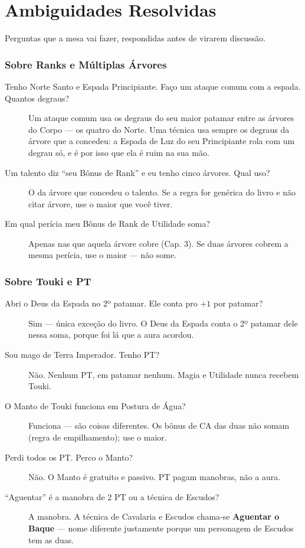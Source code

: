 \chapter{Ambiguidades Resolvidas}

Perguntas que a mesa vai fazer, respondidas antes de virarem discussão.

\subsection{Sobre Ranks e Múltiplas Árvores}

\begin{description}
    \item[Tenho Norte Santo e Espada Principiante. Faço um ataque comum com a espada.
          Quantos degraus?] Um ataque comum usa os degraus do seu maior patamar entre as
          árvores do Corpo --- os quatro do Norte. Uma técnica usa sempre os degraus da árvore
          que a concedeu: a Espada de Luz do seu Principiante rola com um degrau só, e é por
          isso que ela é ruim na sua mão.
    \item[Um talento diz \enquote{seu Bônus de Rank} e eu tenho cinco árvores. Qual uso?] O da
          árvore que concedeu o talento. Se a regra for genérica do livro e não citar árvore,
          use o maior que você tiver.
    \item[Em qual perícia meu Bônus de Rank de Utilidade soma?] Apenas nas que aquela árvore
          cobre (Cap. 3). Se duas árvores cobrem a mesma perícia, use o maior --- não some.
\end{description}

\subsection{Sobre Touki e PT}

\begin{description}
    \item[Abri o Deus da Espada no 2º patamar. Ele conta pro $+1$ por patamar?] Sim --- única
          exceção do livro. O Deus da Espada conta o 2º patamar dele nessa soma, porque foi lá
          que a aura acordou.
    \item[Sou mago de Terra Imperador. Tenho PT?] Não. Nenhum PT, em patamar nenhum. Magia e
          Utilidade nunca recebem Touki.
    \item[O Manto de Touki funciona em Postura de Água?] Funciona --- são coisas diferentes.
          Os bônus de CA das duas não somam (regra de empilhamento); use o maior.
    \item[Perdi todos os PT. Perco o Manto?] Não. O Manto é gratuito e passivo. PT pagam
          manobras, não a aura.
    \item[\enquote{Aguentar} é a manobra de 2 PT ou a técnica de Escudos?] A manobra. A técnica
          de Cavalaria e Escudos chama-se \textbf{Aguentar o Baque} --- nome diferente
          justamente porque um personagem de Escudos tem as duas.
\end{description}

